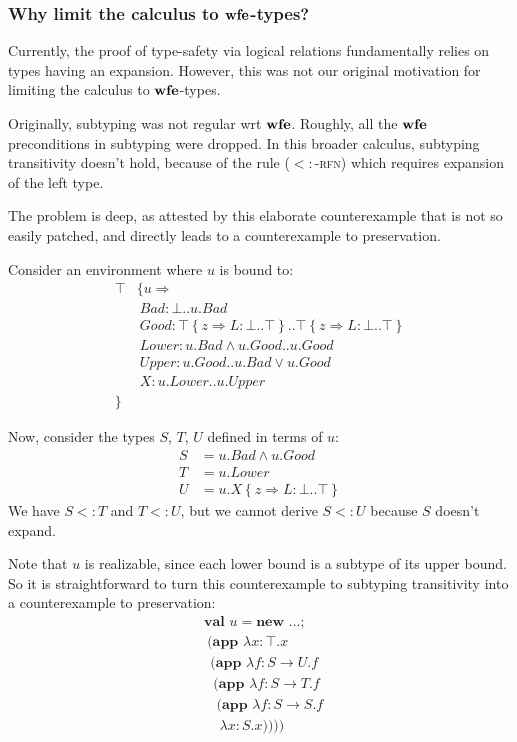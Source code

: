 \documentclass[9pt]{sigplanconf}
\newcommand{\sub}{<:}
\newcommand{\nswfe}{\mbox{\textbf{wfe}}}
\newcommand{\tfun}{\rightarrow}
\newcommand{\tand}{\wedge}
\newcommand{\tor}{\vee}
\newcommand{\refine}[2]{\left\{#1 \Rightarrow #2 \right\}}
\newcommand{\mlrefine}[2]{\{#1 \Rightarrow #2 \}}
\newcommand{\abs}[3]{\lambda #1\!:\!#2.#3}
\newcommand{\mlnew}[3]{\textbf{val }#1 = \textbf{new }#2 ;\;\\&#3}
\newcommand{\Ldecl}[3]{#1 : #2..#3}%
\newcommand{\Top}{\top}%
\newcommand{\Bot}{\bot}%
\newcommand{\mlapp}[2]{(\textbf{app }#1\;\\&#2)}
\begin{document}
\subsubsection{Why limit the calculus to $\nswfe$-types?}\label{dot-variants-why-wfe}

Currently, the proof of type-safety via logical relations
fundamentally relies on types having an expansion. However, this was
not our original motivation for limiting the calculus to $\nswfe$-types.

Originally, subtyping was not regular wrt $\nswfe$. Roughly,
all the $\nswfe$ preconditions in subtyping were dropped. In this
broader calculus, subtyping transitivity doesn't hold, because of the
rule (\textsc{$\sub$-rfn}) which requires expansion of the left type.

The problem is deep, as attested by this elaborate counterexample
that is not so easily patched, and directly leads to a counterexample
to preservation.

Consider an environment where $u$ is bound to:
\begin{align*}
\Top & \mlrefine u {\\
&\ \Ldecl {\mathit{Bad}} {\Bot} {u.\mathit{Bad}}\\
&\ \Ldecl {\mathit{Good}} {\Top \refine z {\Ldecl L \Bot \Top}} {\Top \refine z {\Ldecl L \Bot \Top}}\\
&\ \Ldecl {\mathit{Lower}} {u.\mathit{Bad} \tand u.\mathit{Good}} {u.\mathit{Good}}\\
&\ \Ldecl {\mathit{Upper}} {u.\mathit{Good}} {u.\mathit{Bad} \tor u.\mathit{Good}}\\
&\ \Ldecl X {u.\mathit{Lower}} {u.\mathit{Upper}}\\
}&
\end{align*}

Now, consider the types $S$, $T$, $U$ defined in terms of $u$:
\begin{align*}
S &= u.\mathit{Bad} \tand u.\mathit{Good}\\
T &= u.\mathit{Lower}\\
U &= u.X \refine z {\Ldecl L \Bot \Top}
\end{align*}
We have $S \sub T$ and $T \sub U$, but we cannot derive $S \sub U$ because
$S$ doesn't expand.

Note that $u$ is realizable, since each lower bound is a subtype of
its upper bound. So it is straightforward to turn this counterexample
to subtyping transitivity into a counterexample to preservation:
\begin{align*}
&\mlnew u \ldots {
\ \mlapp{\abs x \Top x}{
\ \ \mlapp{\abs f {S \tfun U} f}{
\ \ \ \mlapp{\abs f {S \tfun T} f}{
\ \ \ \ \mlapp{\abs f {S \tfun S} f}{
\ \ \  \ \ \abs x S x}}}}}
\end{align*}
\end{document}
